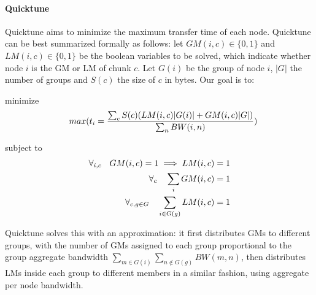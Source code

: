 \paragraph{Quicktune}
Quicktune aims to minimize the maximum transfer time of each node. Quicktune can be best summarized formally as follows: let $GM(i,c) \in \{0,1\}$ and $LM(i,c) \in \{0,1\}$ be the boolean variables to be solved, which indicate whether node $i$ is the GM or LM of chunk $c$. Let $G(i)$ be the group of node $i$, $|G|$ the number of groups and $S(c)$ the size of $c$ in bytes. Our goal is to:

minimize
\begin{align*}
\small
\label{eq:quicktuneobj}
   \quad max(t_i = \frac{\sum_{c}S(c)(LM(i,c)|G(i)| + GM(i,c)|G|)}{\sum_{n}BW(i,n)})
\end{align*}

subject to
\begin{align*}
\small
    \forall_{i,c} \quad GM(i,c) = 1 \implies LM(i,c) = 1 \\
    \forall_{c} \quad \sum_{i}GM(i, c) = 1 \\
    \forall_{c,g \in G} \quad \sum_{i \in G(g)}LM(i,c) = 1
\end{align*}

Quicktune solves this with an approximation: it first distributes GMs to different groups, with the number of GMs assigned to each group proportional to the group aggregate bandwidth $\sum_{m \in G(i)}\sum_{n \notin G(g)}BW(m,n)$, then distributes LMs inside each group to different members in a similar fashion, using aggregate per node bandwidth.



